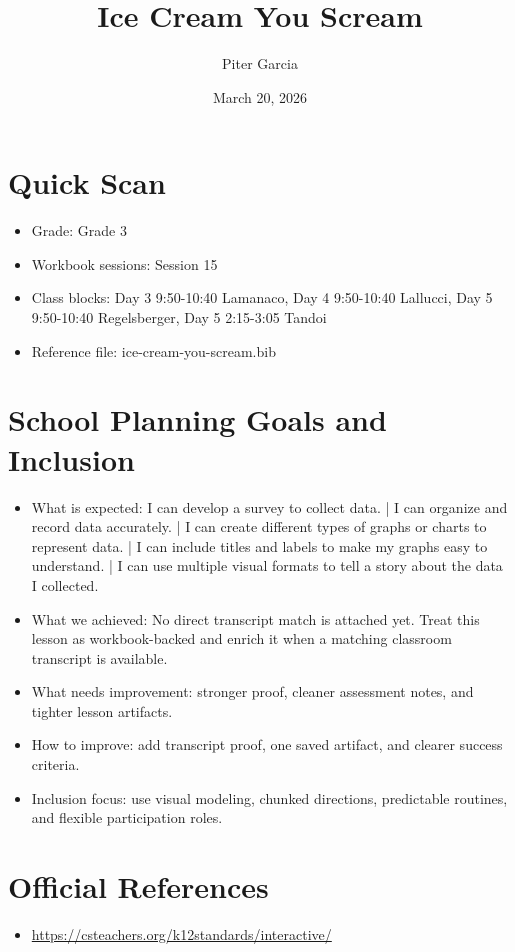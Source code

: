 \documentclass[11pt]{article}
\title{Ice Cream You Scream}
\author{Piter Garcia}
\date{March 20, 2026}
\begin{document}
\maketitle
\section*{Quick Scan}
\begin{itemize}[leftmargin=*]
\item Grade: Grade 3
\item Workbook sessions: Session 15
\item Class blocks: Day 3 9:50-10:40 Lamanaco, Day 4 9:50-10:40 Lallucci, Day 5 9:50-10:40 Regelsberger, Day 5 2:15-3:05 Tandoi
\item Reference file: ice-cream-you-scream.bib
\end{itemize}
\section*{School Planning Goals and Inclusion}
\begin{itemize}[leftmargin=*]
\item What is expected: I can develop a survey to collect data. | I can organize and record data accurately. | I can create different types of graphs or charts to represent data. | I can include titles and labels to make my graphs easy to understand. | I can use multiple visual formats to tell a story about the data I collected.
\item What we achieved: No direct transcript match is attached yet. Treat this lesson as workbook-backed and enrich it when a matching classroom transcript is available.
\item What needs improvement: stronger proof, cleaner assessment notes, and tighter lesson artifacts.
\item How to improve: add transcript proof, one saved artifact, and clearer success criteria.
\item Inclusion focus: use visual modeling, chunked directions, predictable routines, and flexible participation roles.
\end{itemize}
\section*{Official References}
\begin{itemize}[leftmargin=*]
\item \url{https://csteachers.org/k12standards/interactive/}

\end{itemize}
\end{document}
